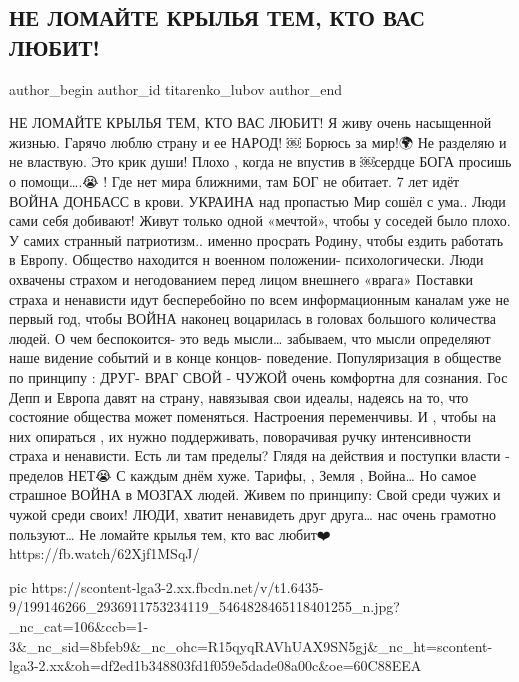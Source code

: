  
 
 
 
 
 
\subsection{НЕ ЛОМАЙТЕ КРЫЛЬЯ ТЕМ, КТО ВАС ЛЮБИТ!}
\label{sec:11_06_2021.fb.titarenko_lubov.1.ljubov_strana_krylja_ne_lomajte}
\ifcmt
 author_begin
   author_id titarenko_lubov
 author_end
\fi

НЕ ЛОМАЙТЕ КРЫЛЬЯ ТЕМ, 
КТО ВАС ЛЮБИТ!
 Я живу очень насыщенной жизнью. Гарячо люблю страну и 
ее НАРОД! ￼ Борюсь за мир!🌍
Не разделяю и не властвую.
Это крик души!
Плохо , когда не впустив в ￼сердце БОГА  просишь о помощи….😭 ! 
Где нет мира ближними, там БОГ не обитает.
7 лет идёт ВОЙНА
ДОНБАСС в крови.
УКРАИНА над пропастью
Мир сошёл с ума.. 
 Люди сами себя добивают!
Живут только одной «мечтой», чтобы у соседей было плохо. 
У самих странный  патриотизм.. именно
просрать Родину, чтобы  ездить работать в Европу.
Общество находится н военном положении- психологически. 
Люди охвачены страхом и негодованием перед лицом внешнего «врага»
Поставки страха  и ненависти идут бесперебойно  по всем информационным каналам уже не первый год, чтобы  ВОЙНА наконец воцарилась в головах большого количества людей. 
 О чем беспокоится- это ведь мысли… забываем, что мысли определяют наше видение событий и в конце концов- поведение.
Популяризация в обществе 
по принципу :
ДРУГ- ВРАГ
СВОЙ - ЧУЖОЙ 
очень комфортна для сознания.
Гос Депп  и Европа давят 
на страну, навязывая свои идеалы, надеясь на то, что состояние общества может поменяться. 
Настроения переменчивы. 
И , чтобы на них опираться , их нужно поддерживать, поворачивая ручку интенсивности страха и ненависти. 
Есть ли там пределы? 
Глядя на действия и поступки власти - пределов НЕТ😭
С каждым днём хуже. Тарифы, , Земля , Война…
Но самое страшное
ВОЙНА в МОЗГАХ людей.
Живем по принципу: 
Свой среди чужих и 
чужой среди своих!
ЛЮДИ, хватит ненавидеть друг друга…  нас очень грамотно пользуют… 
Не ломайте крылья тем, кто вас любит❤️🙏 https://fb.watch/62Xjf1MSqJ/

\ifcmt
  pic https://scontent-lga3-2.xx.fbcdn.net/v/t1.6435-9/199146266_2936911753234119_5464828465118401255_n.jpg?_nc_cat=106&ccb=1-3&_nc_sid=8bfeb9&_nc_ohc=R15qyqRAVhUAX9SN5gj&_nc_ht=scontent-lga3-2.xx&oh=df2ed1b348803fd1f059e5dade08a00c&oe=60C88EEA
\fi
